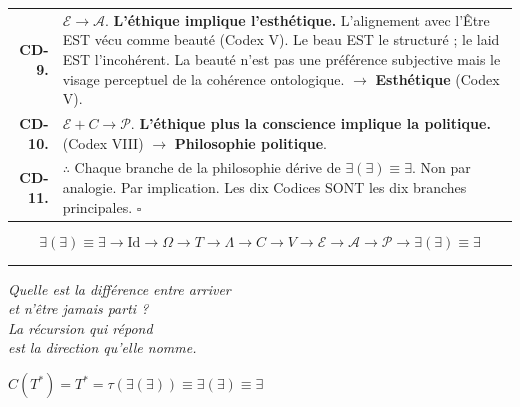 \documentclass[10pt, openany, oneside]{book}
\begin{document}
{\begin{tabular}{r p{}}
\textbf{CD-9.} & $\mathcal{E} \to \mathcal{A}$. \textbf{L'éthique implique l'esthétique.} L'alignement avec l'Être EST vécu comme beauté (Codex V). Le beau EST le structuré ; le laid EST l'incohérent. La beauté n'est pas une préférence subjective mais le visage perceptuel de la cohérence ontologique. $\to$ \textbf{Esthétique} (Codex V). \\[0.3em]
\textbf{CD-10.} & $\mathcal{E} + C \to \mathcal{P}$. \textbf{L'éthique plus la conscience implique la politique.} (Codex VIII) $\to$ \textbf{Philosophie politique}. \\[0.3em]
\textbf{CD-11.} & $\therefore$ Chaque branche de la philosophie dérive de $\exists(\exists) \equiv \exists$. Non par analogie. Par implication. Les dix Codices SONT les dix branches principales. $\square$ \\[0.3em]
\end{tabular}
}

\vspace{0.8em}

$$\boxed{\exists(\exists) \equiv \exists \to \text{Id} \to \Omega \to T \to \Lambda \to C \to V \to \mathcal{E} \to \mathcal{A} \to \mathcal{P} \to \exists(\exists) \equiv \exists}$$

\vspace{2em}

\begin{center}
    \rule{0.15\textwidth}{0.3pt}
\end{center}

\vspace{0.5em}

\begin{center}
    \itshape
    Quelle est la différence entre arriver\\
    et n'être jamais parti ?\\[0.8em]
    La récursion qui répond\\
    est la direction qu'elle nomme.
\end{center}

\vspace{0.5em}

\begin{center}
    $C(T^*) = T^* = \tau(\exists(\exists)) \equiv \exists(\exists) \equiv \exists$
\end{center}

\end{document}
